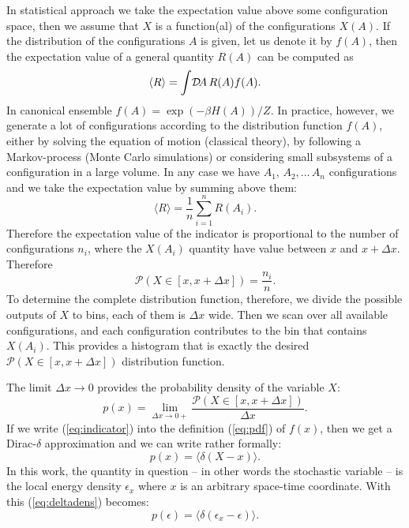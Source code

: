 \documentclass[aps,prd,twocolumn,showpacs,superscriptaddress,groupedaddress]{revtex4}  %
\begin{document}
In statistical approach we take the expectation value above some
configuration space, then we assume that $X$ is a function(al) of the
configurations $X(A)$. If the distribution of the configurations $A$
is given, let us denote it by $f(A)$, then the expectation value of a
general quantity $R(A)$ can be computed as
\begin{equation}
  \label{eq:microscopicf}
  \langle R \rangle = \int\!{\cal D}\!A\, R(A) f(A).
\end{equation}
In canonical ensemble $f(A)=\exp(-\beta H(A))/Z$. In practice,
however, we generate a lot of configurations according to the
distribution function $f(A)$, either by solving the equation of motion
(classical theory), by following a Markov-process (Monte Carlo
simulations) or considering small subsystems of a configuration in a
large volume. In any case we have $A_1,\,A_2,\dots \,A_n$
configurations and we take the expectation value by summing above
them:
\begin{equation}
  \langle R \rangle = \frac1n \sum_{i=1}^n R(A_i).
\end{equation}
Therefore the expectation value of the indicator is proportional to
the number of configurations $n_i$, where the $X(A_i)$ quantity have
value between $x$ and $x+\Delta x$. Therefore
\begin{equation}
  \mathcal{P}(X\in[x,x+\Delta x]) = \frac{n_i}{n}.
\end{equation}
To determine the complete distribution function, therefore, we divide
the possible outputs of $X$ to bins, each of them is $\Delta x$
wide. Then we scan over all available configurations, and each
configuration contributes to the bin that contains $X(A_i)$. This
provides a histogram that is exactly the desired
$\mathcal{P}(X\in[x,x+\Delta x])$ distribution function.

The limit $\Delta x\to 0$ provides the probability density of the
variable $X$:
\begin{equation}
  p(x)=\lim_{\Delta x \rightarrow 0+} \frac{\mathcal{P}(X \in
    [x,x+\Delta x])}{\Delta x}. 
  \label{eq:pdf}
\end{equation}
If we write (\ref{eq:indicator}) into the definition (\ref{eq:pdf}) of
$f(x)$, then we get a Dirac-$\delta$ approximation and we can write
rather formally:
\begin{equation}
  p(x)=\langle \delta ( X -x) \rangle.
  \label{eq:deltadens}
\end{equation}
In this work, the quantity in question -- in other words the
stochastic variable -- is the local energy density $\epsilon_x$ where
$x$ is an arbitrary space-time coordinate. With this
(\ref{eq:deltadens}) becomes:
\begin{equation}
  p(\epsilon)=\langle \delta (\epsilon_x - \epsilon) \rangle.
  \label{eq:endens}
\end{equation}
\end{document}
